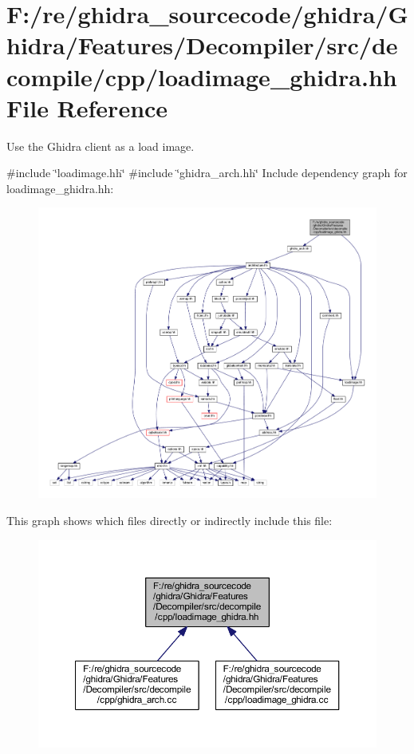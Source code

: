\hypertarget{loadimage__ghidra_8hh}{}\section{F\+:/re/ghidra\+\_\+sourcecode/ghidra/\+Ghidra/\+Features/\+Decompiler/src/decompile/cpp/loadimage\+\_\+ghidra.hh File Reference}
\label{loadimage__ghidra_8hh}


Use the Ghidra client as a load image.  


{\ttfamily \#include \char`\"{}loadimage.\+hh\char`\"{}}\newline
{\ttfamily \#include \char`\"{}ghidra\+\_\+arch.\+hh\char`\"{}}\newline
Include dependency graph for loadimage\+\_\+ghidra.\+hh\+:
\nopagebreak
\begin{figure}[H]
\begin{center}
\leavevmode
\includegraphics[width=350pt]{loadimage__ghidra_8hh__incl}
\end{center}
\end{figure}
This graph shows which files directly or indirectly include this file\+:
\nopagebreak
\begin{figure}[H]
\begin{center}
\leavevmode
\includegraphics[width=350pt]{loadimage__ghidra_8hh__dep__incl}
\end{center}
\end{figure}
